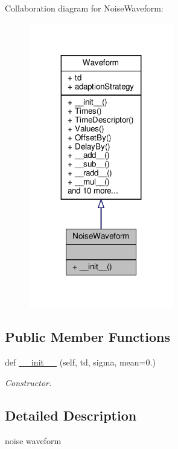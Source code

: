Collaboration diagram for Noise\+Waveform\+:
\nopagebreak
\begin{figure}[H]
\begin{center}
\leavevmode
\includegraphics[width=179pt]{classSignalIntegrity_1_1TimeDomain_1_1Waveform_1_1NoiseWaveform_1_1NoiseWaveform__coll__graph}
\end{center}
\end{figure}
\subsection*{Public Member Functions}
\begin{DoxyCompactItemize}
\item 
def \hyperlink{classSignalIntegrity_1_1TimeDomain_1_1Waveform_1_1NoiseWaveform_1_1NoiseWaveform_ae21c6cd231683be0c411972c12609995}{\+\_\+\+\_\+init\+\_\+\+\_\+} (self, td, sigma, mean=0.)
\begin{DoxyCompactList}\small\item\em Constructor. \end{DoxyCompactList}\end{DoxyCompactItemize}


\subsection{Detailed Description}
noise waveform 

